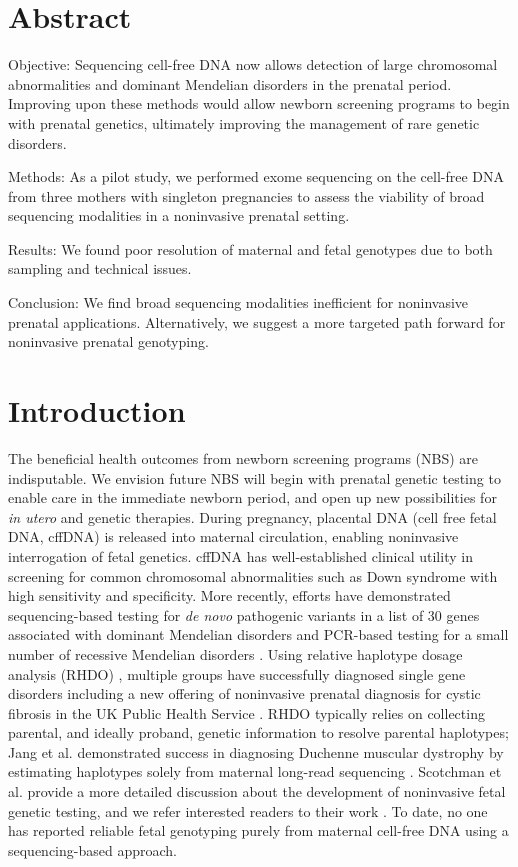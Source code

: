 \documentclass{article}\usepackage[]{graphicx}\usepackage[]{color}
\begin{document}
\section*{Abstract}

Objective: Sequencing cell-free DNA now allows detection of large chromosomal abnormalities and dominant Mendelian disorders in the prenatal period.
Improving upon these methods would allow newborn screening programs to begin with prenatal genetics, ultimately improving the management of rare genetic disorders.

Methods: As a pilot study, we performed exome sequencing on the cell-free DNA from three mothers with singleton pregnancies to assess the viability of broad sequencing modalities in a noninvasive prenatal setting.

Results: We found poor resolution of maternal and fetal genotypes due to both sampling and technical issues.

Conclusion: We find broad sequencing modalities inefficient for noninvasive prenatal applications.
Alternatively, we suggest a more targeted path forward for noninvasive prenatal genotyping.

\section{Introduction}

The beneficial health outcomes from newborn screening programs (NBS) are indisputable.
We envision future NBS will begin with prenatal genetic testing to enable care in the immediate newborn period, and open up new possibilities for \textit{in utero} and genetic therapies.
During pregnancy, placental DNA (cell free fetal DNA, cffDNA) is released into maternal circulation, enabling noninvasive interrogation of fetal genetics.
cffDNA has well-established clinical utility in screening for common chromosomal abnormalities such as Down syndrome with high sensitivity and specificity\cite{mackie:2017aa}.
More recently, efforts have demonstrated sequencing-based testing for \textit{de novo} pathogenic variants in a list of 30 genes associated with dominant Mendelian disorders \cite{zhang:2019aa} and PCR-based testing for a small number of recessive Mendelian disorders \cite{tsao:2019ab}.
Using relative haplotype dosage analysis (RHDO) \cite{lo:2010aa}, multiple groups have successfully diagnosed single gene disorders \cite{hui:2017aa,vermeulen:2017aa,jang:2018aa} including a new offering of noninvasive prenatal diagnosis for cystic fibrosis in the UK Public Health Service \cite{chandler:2020aa}.
RHDO typically relies on collecting parental, and ideally proband, genetic information to resolve parental haplotypes; Jang et al. demonstrated success in diagnosing Duchenne muscular dystrophy by estimating haplotypes solely from maternal long-read sequencing \cite{jang:2018aa}.
Scotchman et al. provide a more detailed discussion about the development of noninvasive fetal genetic testing, and we refer interested readers to their work \cite{scotchman:2020aa}.
To date, no one has reported reliable fetal genotyping purely from maternal cell-free DNA using a sequencing-based approach.
\end{document}
